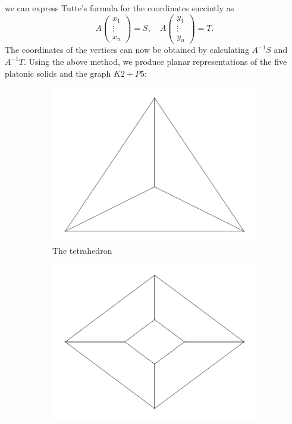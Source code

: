\documentclass[12pt]{article}
\begin{document}
we can express Tutte's formula for the coordinates succintly as 
\[A\begin{pmatrix} x_1 \\ \vdots \\ x_n\end{pmatrix} = S, \quad 
  A\begin{pmatrix} y_1 \\ \vdots \\ y_n\end{pmatrix} = T. \]
  The coordinates of the vertices can now be obtained by calculating \(A^{-1}S\)
  and \(A^{-1}T\). Using the above method, we produce planar representations of the five
  platonic solids and the graph \(K2+P5\):

  \begin{figure}[H]
      \centering 
      \begin{subfigure}[b]{0.3\textwidth}
          \centering 
          \includegraphics[width = \textwidth]{../output/Q1-platonic-4.pdf}
          \caption{The tetrahedron}
      \end{subfigure}
      \hfill
      \begin{subfigure}[b]{0.3\textwidth}
          \centering 
          \includegraphics[width = \textwidth]{../output/Q1-platonic-6.pdf}

\end{subfigure}
\end{figure}
\end{document}
